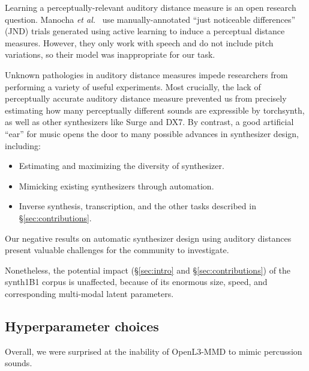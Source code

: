Learning a perceptually-relevant auditory distance measure is an open research question. Manocha {\em et al.}\ \cite{Manocha:2020:ADP} use manually-annotated ``just noticeable differences'' (JND) trials generated using active learning to induce a perceptual distance measures. However, they only work with speech and do not include pitch variations, so their model was inappropriate for our task.

Unknown pathologies in auditory distance measures impede researchers from performing a variety of useful experiments. Most crucially, the lack of perceptually accurate auditory distance measure prevented us from precisely estimating how many perceptually different sounds are expressible by torchsynth, as well as other synthesizers like Surge and DX7. By contrast, a good artificial ``ear'' for music opens the door to many possible advances in synthesizer design, including:
\begin{itemize}
    \item Estimating and maximizing the diversity of synthesizer.
    \item Mimicking existing synthesizers through automation.
    \item Inverse synthesis, transcription, and the other tasks described in \S\ref{sec:contributions}. 
\end{itemize}
Our negative results on automatic synthesizer design using auditory distances present valuable challenges for the community to investigate.

Nonetheless, the potential impact (\S\ref{sec:intro} and \S\ref{sec:contributions}) of the synth1B1 corpus is unaffected, because of its enormous size, speed, and corresponding multi-modal latent parameters.



\iffalse
\subsection{Hyperparameter choices}

Overall, we were surprised at the inability of OpenL3-MMD to mimic percussion sounds.

